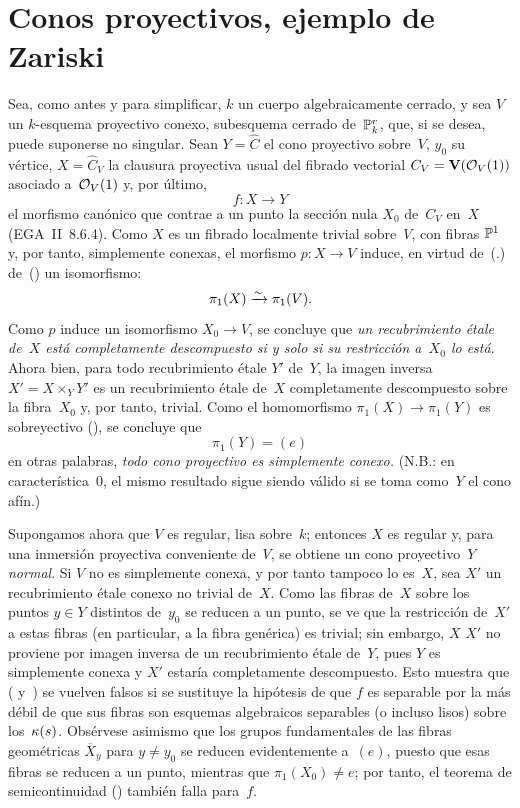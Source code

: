 \section{Conos proyectivos, ejemplo de Zariski}
\label{XI.3}

Sea, como antes y para simplificar, $k$ un cuerpo algebraicamente cerrado,
y sea $V$ un $k$-esquema proyectivo conexo, subesquema cerrado
de~$\PP^r_k$, que, si se desea, puede suponerse no singular. Sean
$Y=\hat C$ el cono proyectivo sobre~$V$, $y_0$ su vértice,
$X=\hat C_V$ la clausura proyectiva usual del fibrado vectorial
$C_V=\VV(\cal{O}_V(1))$ asociado a~$\cal{O}_V(1)$ y, por último,
$$
f\colon X\to Y
$$
el morfismo canónico que contrae a un punto la sección nula $X_0$
de~$C_V$ en~$X$ (EGA~II~8.6.4). Como $X$ es un fibrado localmente trivial
sobre~$V$, con fibras $\PP^1$ y, por tanto, simplemente conexas, el
morfismo $p\colon X\to V$ induce, en virtud
{de~(.)}
{de~()}
un isomorfismo:
$$
\pi_1(X)\isomto\pi_1(V)\quoi.
$$
Como $p$ induce un isomorfismo $X_0\to V$, se concluye que
\emph{un recubrimiento étale de~$X$ está completamente descompuesto si y
solo si su restricción a~$X_0$ lo está}. Ahora bien, para todo recubrimiento
étale $Y'$ de~$Y$, la imagen inversa $X'=X\times_Y Y'$ es un recubrimiento
étale de~$X$ completamente descompuesto sobre la fibra~$X_0$ y, por tanto,
trivial. Como el homomorfismo $\pi_1(X)\to\pi_1(Y)$ es sobreyectivo
(), se concluye que
$$
\pi_1(Y)=(e)
$$
en otras palabras, \emph{todo cono proyectivo es simplemente conexo.}
(N.B.: en característica~$0$, el mismo resultado sigue siendo válido si se
toma como~$Y$ el cono afín.)

Supongamos ahora que $V$ es regular, \ie lisa sobre~$k$; entonces $X$ es
regular y, para una inmersión proyectiva conveniente de~$V$, se obtiene un
cono proyectivo~$Y$ \emph{normal}. Si $V$ no es simplemente conexa, y por
tanto tampoco lo es~$X$, sea $X'$ un recubrimiento étale conexo no trivial
de~$X$. Como las fibras de~$X$ sobre los puntos $y\in Y$ distintos de~$y_0$
se reducen a un punto, se ve que la restricción de~$X'$ a estas fibras
(en particular, a la fibra
genérica) es trivial; sin embargo,
{$X$}
{$X'$}
no proviene por imagen inversa de un recubrimiento étale de~$Y$, pues $Y$
es simplemente conexa y $X'$ estaría completamente descompuesto. Esto
muestra que ( y~) se vuelven falsos si se sustituye
la hipótesis de que $f$ es separable por la más débil de que sus fibras son
esquemas algebraicos separables (o incluso lisos) sobre los~$\kres(s)$.
Obsérvese asimismo que los grupos fundamentales de las fibras geométricas
$\overline X_y$ para $y\neq y_0$ se reducen evidentemente a~$(e)$, puesto
que esas fibras se reducen a un punto, mientras que $\pi_1(X_0)\neq e$;
por tanto, el teorema de semicontinuidad () también falla
para~$f$.

